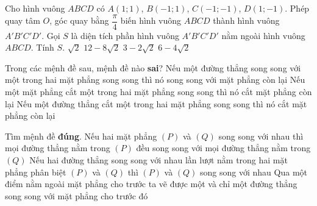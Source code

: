 \begin{ex}%
	Cho hình vuông $ABCD$ có $A(1;1)$, $B(-1;1)$, $C(-1;-1)$, $D(1;-1).$ Phép quay tâm $O$, góc quay bằng $\dfrac{\pi}{4}$ biến hình vuông $ABCD$ thành hình vuông $A'B'C'D'$. Gọi $S$ là diện tích phần hình vuông $A'B'C'D'$ nằm ngoài hình vuông $ABCD.$ Tính $S.$
	\choice
	{$\sqrt 2$}
	{\True $12-8\sqrt 2$}
	{$3-2\sqrt 2$}
	{$6-4\sqrt 2$}
\end{ex}

\begin{ex}%
	Trong các mệnh đề sau, mệnh đề nào {\bf sai}?
	{\True Nếu một đường thẳng song song với một trong hai mặt phẳng song song thì nó song song với mặt phẳng còn lại}
	{Nếu một mặt phẳng cắt một trong hai mặt phẳng song song thì nó cắt mặt phẳng còn lại}
	{Nếu một đường thẳng cắt một trong hai mặt phẳng song song thì nó cắt mặt phẳng còn lại}
\end{ex}

\begin{ex}%
	Tìm mệnh đề \textbf{đúng}.
	{Nếu hai mặt phẳng $(P)$ và $(Q)$ song song với nhau thì mọi đường thẳng nằm trong $(P)$ đều song song với mọi đường thẳng nằm trong $(Q)$}
	{Nếu hai đường thẳng song song với nhau lần lượt nằm trong hai mặt phẳng phân biệt $(P)$ và $(Q)$ thì $(P)$ và $(Q)$ song song với nhau}
	{Qua một điểm nằm ngoài mặt phẳng cho trước ta vẽ được một và chỉ một đường thẳng song song với mặt phẳng cho trước đó}
\end{ex}

